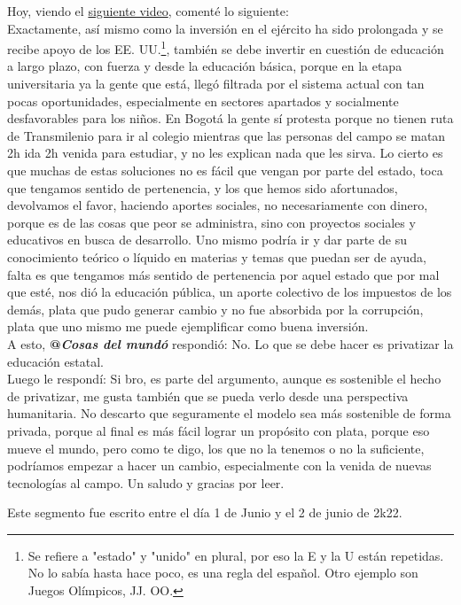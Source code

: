 \documentclass{article}
\begin{document}
Hoy, viendo el
\href{https://youtu.be/kicLOUbQ53g}{siguiente video}, comenté lo siguiente:\\

Exactamente, así mismo como la inversión en el ejército ha sido prolongada y se recibe apoyo de los EE. UU.\footnote{Se refiere a "estado" y "unido" en plural, por eso la E y la U están repetidas. No lo sabía hasta hace poco, es una regla del español. Otro ejemplo son Juegos Olímpicos, JJ. OO.},
también se debe invertir en cuestión de educación a largo plazo, con fuerza y desde la educación básica, porque en la etapa universitaria ya la gente que está, llegó filtrada por el sistema actual con tan pocas oportunidades, especialmente en sectores apartados y socialmente desfavorables para los niños. En Bogotá la gente sí protesta porque no tienen ruta de Transmilenio para ir al colegio mientras que las personas del campo se matan 2h ida 2h venida para estudiar, y no les explican nada que les sirva. Lo cierto es que muchas de estas soluciones no es fácil que vengan por parte del estado, toca que tengamos sentido de pertenencia, y los que hemos sido afortunados, devolvamos el favor, haciendo aportes sociales, no necesariamente con dinero, porque es de las cosas que peor se administra, sino con proyectos sociales y educativos en busca de desarrollo. Uno mismo podría ir y dar parte de su conocimiento teórico o líquido en materias y temas que puedan ser de ayuda, falta es que tengamos más sentido de pertenencia por aquel estado que por mal que esté, nos dió la educación pública, un aporte colectivo de los impuestos de los demás, plata que pudo generar cambio y no fue absorbida por la corrupción, plata que uno mismo me puede ejemplificar como buena inversión.\\

A esto, \textbf{@\textit{Cosas del mundó}} respondió: No. Lo que se debe hacer es privatizar la educación estatal. \\

Luego le respondí: Si bro, es parte del argumento, aunque es sostenible el hecho de privatizar, me gusta también que se pueda verlo desde una perspectiva humanitaria. No descarto que seguramente el modelo sea más sostenible de forma privada, porque al final es más fácil lograr un propósito con plata, porque eso mueve el mundo, pero como te digo, los que no la tenemos o no la suficiente, podríamos empezar a hacer un cambio, especialmente con la venida de nuevas tecnologías al campo. Un saludo y gracias por leer.

Este segmento fue escrito entre el día 1 de Junio y el 2 de junio de 2k22.
\end{document}
